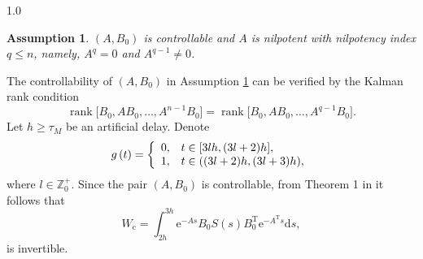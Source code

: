 \documentclass[journal]{IEEEtran}
\newtheorem{assumption}{Assumption}
\begin{document}
\begin{spacing}{1.0}
\begin{assumption}
\label{ass0}$(A,B_{0})$ is controllable and $A$ is nilpotent with nilpotency
index $q\leq n$, namely, $A^{q}=0$ and $A^{q-1}\neq0$.
\end{assumption}
The controllability of $(A,B_{0})$ in Assumption \ref{ass0} can be verified by the
Kalman rank condition
\[
\operatorname{rank} \bigl[ B_0, AB_0, \ldots, A^{n-1}B_0 \bigr]
=
\operatorname{rank} \bigl[ B_0, AB_0, \ldots, A^{q-1}B_0 \bigr].
\]
Let $h\geq\tau_{M}$ be an artificial delay. Denote
\[
g\left(  t\right)  =\left\{
\begin{array}
[c]{cl}%
0, & t\in\lbrack3lh,(3l+2)h],\\
1, & t\in((3l+2)h,(3l+3)h),
\end{array}
\right.
\]
where $l\in%
\mathbb{Z}
_{0}^{+}$. Since the pair $(A,B_{0})$ is controllable, from Theorem 1 in
\cite{Zhou21tac} it follows that
\[
W_{\mathrm{c}}=\int_{2h}^{3h}\mathrm{e}^{-As}B_{0}S(s)B_{0}^{\mathrm{T}}\mathrm{e}^{-A^{\mathrm{T}}s}\mathrm{d}s,
\]
is invertible.


\end{spacing}
\end{document}
